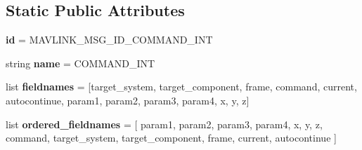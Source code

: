 \subsection*{Static Public Attributes}
\begin{DoxyCompactItemize}
\item 
\mbox{\label{classpymavlink_1_1dialects_1_1v10_1_1MAVLink__command__int__message_a6091fab881d83a52b6450af90b50db8b}} 
{\bfseries id} = M\+A\+V\+L\+I\+N\+K\+\_\+\+M\+S\+G\+\_\+\+I\+D\+\_\+\+C\+O\+M\+M\+A\+N\+D\+\_\+\+I\+NT
\item 
\mbox{\label{classpymavlink_1_1dialects_1_1v10_1_1MAVLink__command__int__message_ad638211d672d90d2f9471fa846350e1b}} 
string {\bfseries name} = \textquotesingle{}C\+O\+M\+M\+A\+N\+D\+\_\+\+I\+NT\textquotesingle{}
\item 
\mbox{\label{classpymavlink_1_1dialects_1_1v10_1_1MAVLink__command__int__message_a96f3c04353d8b9857849b405370a5bae}} 
list {\bfseries fieldnames} = \mbox{[}\textquotesingle{}target\+\_\+system\textquotesingle{}, \textquotesingle{}target\+\_\+component\textquotesingle{}, \textquotesingle{}frame\textquotesingle{}, \textquotesingle{}command\textquotesingle{}, \textquotesingle{}current\textquotesingle{}, \textquotesingle{}autocontinue\textquotesingle{}, \textquotesingle{}param1\textquotesingle{}, \textquotesingle{}param2\textquotesingle{}, \textquotesingle{}param3\textquotesingle{}, \textquotesingle{}param4\textquotesingle{}, \textquotesingle{}x\textquotesingle{}, \textquotesingle{}y\textquotesingle{}, \textquotesingle{}z\textquotesingle{}\mbox{]}
\item 
\mbox{\label{classpymavlink_1_1dialects_1_1v10_1_1MAVLink__command__int__message_a185a52f41962f7692a9301b527ab03cf}} 
list {\bfseries ordered\+\_\+fieldnames} = \mbox{[} \textquotesingle{}param1\textquotesingle{}, \textquotesingle{}param2\textquotesingle{}, \textquotesingle{}param3\textquotesingle{}, \textquotesingle{}param4\textquotesingle{}, \textquotesingle{}x\textquotesingle{}, \textquotesingle{}y\textquotesingle{}, \textquotesingle{}z\textquotesingle{}, \textquotesingle{}command\textquotesingle{}, \textquotesingle{}target\+\_\+system\textquotesingle{}, \textquotesingle{}target\+\_\+component\textquotesingle{}, \textquotesingle{}frame\textquotesingle{}, \textquotesingle{}current\textquotesingle{}, \textquotesingle{}autocontinue\textquotesingle{} \mbox{]}

\end{DoxyCompactItemize}
